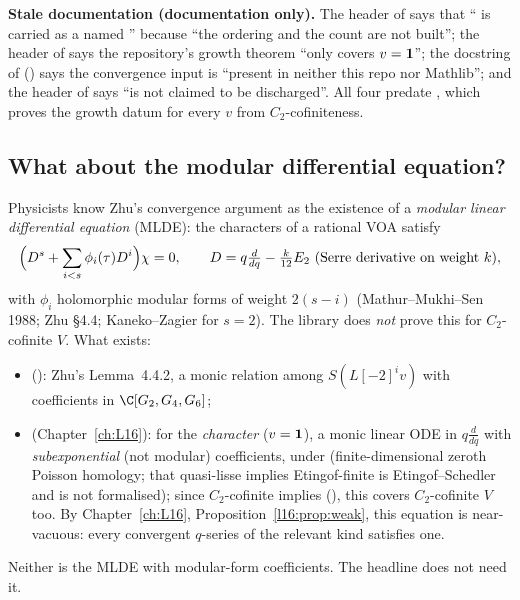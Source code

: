 \begin{warning}
\textbf{Stale documentation (documentation only).} The header of  says that ``
is carried as a named '' because ``the ordering and the count are not built''; the header of
 says the repository's growth theorem ``only covers $v=\mathbf{1}$''; the docstring of
 () says the convergence input is ``present in neither this repo nor
Mathlib''; and the header of  says  ``is not claimed to be discharged''. All four
predate , which proves the growth datum for every $v$ from $C_2$-cofiniteness.
\end{warning}

\subsection{What about the modular differential equation?}\label{l15:sec:mlde}

Physicists know Zhu's convergence argument as the existence of a \emph{modular linear differential equation} (MLDE):
the characters of a rational VOA satisfy
\begin{equation*}
  \Bigl(D^{s}+\sum_{i<s}\phi_i(\tau)D^{i}\Bigr)\chi=0,\qquad D=q\tfrac{d}{dq}-\tfrac{k}{12}E_2\ \text{(Serre derivative on weight }k),
\end{equation*}
with $\phi_i$ holomorphic modular forms of weight $2(s-i)$ (Mathur--Mukhi--Sen 1988; Zhu \S4.4; Kaneko--Zagier for $s=2$).
The library does \emph{not} prove this for $C_2$-cofinite $V$. What exists:
\begin{itemize}
\item {}\allowbreak{} (): Zhu's Lemma~4.4.2, a monic relation among
  $S(L[-2]^iv)$ with coefficients in $\C[G_2,G_4,G_6]$;
\item {}\allowbreak{}\allowbreak{} (Chapter~\ref{ch:L16}): for the \emph{character} ($v=\mathbf{1}$),
  a monic linear ODE in $q\frac d{dq}$ with \emph{subexponential} (not modular) coefficients, under 
  (finite-dimensional zeroth Poisson homology; that quasi-lisse implies Etingof-finite is Etingof--Schedler and is not
  formalised); since $C_2$-cofinite implies  (\allowbreak{}), this
  covers $C_2$-cofinite $V$ too. By Chapter~\ref{ch:L16}, Proposition~\ref{l16:prop:weak}, this equation is near-vacuous:
  every convergent $q$-series of the relevant kind satisfies one.
\end{itemize}
Neither is the MLDE with modular-form coefficients. The headline does not need it.

